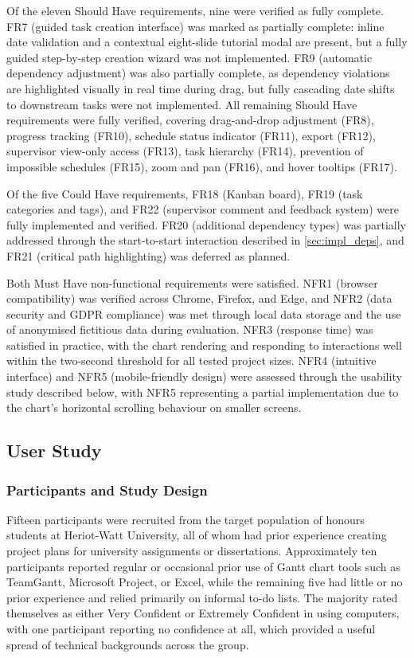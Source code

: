 \documentclass[12pt,nonacm,acmlarge,titlepage,screen]{acmart}
\begin{document}
Of the eleven Should Have requirements, nine were verified as fully complete. FR7
(guided task creation interface) was marked as partially complete: inline date
validation and a contextual eight-slide tutorial modal are present, but a fully
guided step-by-step creation wizard was not implemented. FR9 (automatic dependency
adjustment) was also partially complete, as dependency violations are highlighted
visually in real time during drag, but fully cascading date shifts to downstream
tasks were not implemented. All remaining Should Have requirements were fully
verified, covering drag-and-drop adjustment (FR8), progress tracking (FR10),
schedule status indicator (FR11), export (FR12), supervisor view-only access (FR13),
task hierarchy (FR14), prevention of impossible schedules (FR15), zoom and pan
(FR16), and hover tooltips (FR17).

Of the five Could Have requirements, FR18 (Kanban board), FR19 (task categories and
tags), and FR22 (supervisor comment and feedback system) were fully implemented and
verified. FR20 (additional dependency types) was partially addressed through the
start-to-start interaction described in \cref{sec:impl_deps}, and FR21 (critical path
highlighting) was deferred as planned.

Both Must Have non-functional requirements were satisfied. NFR1 (browser
compatibility) was verified across Chrome, Firefox, and Edge, and NFR2 (data
security and GDPR compliance) was met through local data storage and the use of
anonymised fictitious data during evaluation. NFR3 (response time) was satisfied in
practice, with the chart rendering and responding to interactions well within the
two-second threshold for all tested project sizes. NFR4 (intuitive interface) and
NFR5 (mobile-friendly design) were assessed through the usability study described
below, with NFR5 representing a partial implementation due to the chart's horizontal
scrolling behaviour on smaller screens.

\subsection{User Study} \label{sec:eval_user_study}

\subsubsection{Participants and Study Design}

Fifteen participants were recruited from the target population of honours students at
Heriot-Watt University, all of whom had prior experience creating project plans for
university assignments or dissertations. Approximately ten participants reported regular
or occasional prior use of Gantt chart tools such as TeamGantt, Microsoft Project, or
Excel, while the remaining five had little or no prior experience and relied primarily
on informal to-do lists. The majority rated themselves as either Very Confident or
Extremely Confident in using computers, with one participant reporting no confidence
at all, which provided a useful spread of technical backgrounds across the group.
\end{document}
